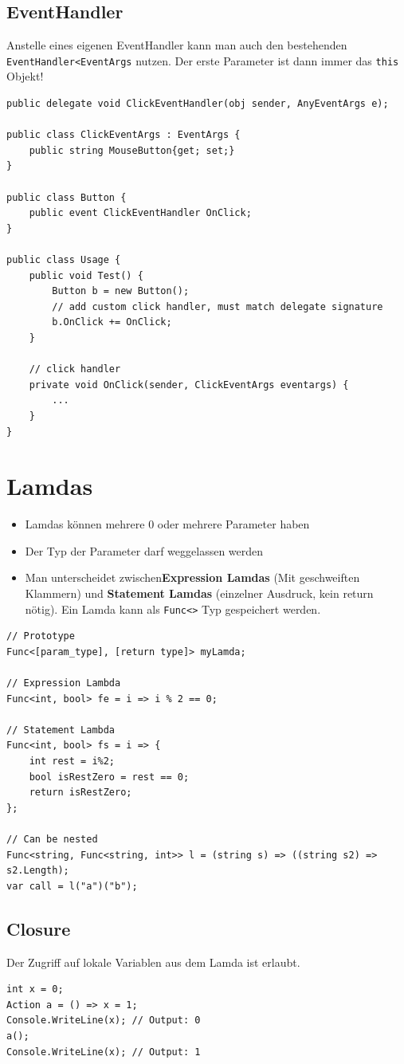 \subsection{EventHandler}
Anstelle eines eigenen EventHandler kann man auch den bestehenden \lstinline|EventHandler<EventArgs| nutzen. Der erste Parameter ist dann immer das \lstinline|this| Objekt!
\begin{lstlisting}[caption=C\# Event Handler]
public delegate void ClickEventHandler(obj sender, AnyEventArgs e);

public class ClickEventArgs : EventArgs {
	public string MouseButton{get; set;}
}

public class Button {
	public event ClickEventHandler OnClick;
}

public class Usage {
	public void Test() {
		Button b = new Button();
		// add custom click handler, must match delegate signature
		b.OnClick += OnClick;
	}
	
	// click handler
	private void OnClick(sender, ClickEventArgs eventargs) {
		...
	}
}
\end{lstlisting}

\section{Lamdas}
\begin{itemize}
	\item Lamdas können mehrere 0 oder mehrere Parameter haben
	\item Der Typ der Parameter darf weggelassen werden
	\item Man unterscheidet zwischen\textbf{Expression Lamdas} (Mit geschweiften Klammern) und \textbf{Statement Lamdas} (einzelner Ausdruck, kein return nötig). Ein Lamda kann als \lstinline|Func<>| Typ gespeichert werden. 
\end{itemize}

\begin{lstlisting}
// Prototype
Func<[param_type], [return type]> myLamda;

// Expression Lambda
Func<int, bool> fe = i => i % 2 == 0;

// Statement Lambda
Func<int, bool> fs = i => {
	int rest = i%2;
	bool isRestZero = rest == 0;
	return isRestZero;
};

// Can be nested
Func<string, Func<string, int>> l = (string s) => ((string s2) => s2.Length);
var call = l("a")("b");
\end{lstlisting}

\subsection{Closure}
Der Zugriff auf lokale Variablen aus dem Lamda ist erlaubt. 
\begin{lstlisting}
int x = 0;
Action a = () => x = 1;
Console.WriteLine(x); // Output: 0
a();
Console.WriteLine(x); // Output: 1
\end{lstlisting}

